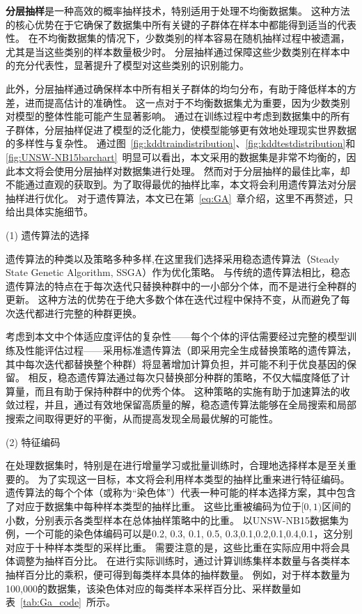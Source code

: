\textbf{分层抽样}是一种高效的概率抽样技术，特别适用于处理不均衡数据集。
这种方法的核心优势在于它确保了数据集中所有关键的子群体在样本中都能得到适当的代表性。
在不均衡数据集的情况下，少数类别的样本容易在随机抽样过程中被遗漏，尤其是当这些类别的样本数量极少时。
分层抽样通过保障这些少数类别在样本中的充分代表性，显著提升了模型对这些类别的识别能力。\par

此外，分层抽样通过确保样本中所有相关子群体的均匀分布，有助于降低样本的方差，进而提高估计的准确性。
这一点对于不均衡数据集尤为重要，因为少数类别对模型的整体性能可能产生显著影响。
通过在训练过程中考虑到数据集中的所有子群体，分层抽样促进了模型的泛化能力，使模型能够更有效地处理现实世界数据的多样性与复杂性。
通过图~\ref{fig:kddtraindistribution}、\ref{fig:kddtestdistribution}和\ref{fig:UNSW-NB15barchart}~明显可以看出，本文采用的数据集是非常不均衡的，因此本文将会使用分层抽样对数据集进行处理。
然而对于分层抽样的最佳比率，却不能通过直观的获取到。为了取得最优的抽样比率，本文将会利用遗传算法对分层抽样进行优化。
对于遗传算法，本文已在第~\ref{eq:GA}~章介绍，这里不再赘述，只给出具体实施细节。\par

(1) 遗传算法的选择\par
遗传算法的种类以及策略多种多样,在这里我们选择采用稳态遗传算法（Steady State Genetic Algorithm, SSGA）作为优化策略。
与传统的遗传算法相比，稳态遗传算法的特点在于每次迭代只替换种群中的一小部分个体，而不是进行全种群的更新。
这种方法的优势在于绝大多数个体在迭代过程中保持不变，从而避免了每次迭代都进行完整的种群更换。\par

考虑到本文中个体适应度评估的复杂性——每个个体的评估需要经过完整的模型训练及性能评估过程——采用标准遗传算法（即采用完全生成替换策略的遗传算法，其中每次迭代都替换整个种群）将显著增加计算负担，并可能不利于优良基因的保留。
相反，稳态遗传算法通过每次只替换部分种群的策略，不仅大幅度降低了计算量，而且有助于保持种群中的优秀个体。
这种策略的实施有助于加速算法的收敛过程，并且，通过有效地保留高质量的解，稳态遗传算法能够在全局搜索和局部搜索之间取得更好的平衡，从而提高发现全局最优解的可能性。

(2) 特征编码\par
在处理数据集时，特别是在进行增量学习或批量训练时，合理地选择样本是至关重要的。
为了实现这一目标，本文将会利用样本类型的抽样比重来进行特征编码。
遗传算法的每个个体（或称为“染色体”）代表一种可能的样本选择方案，其中包含了对应于数据集中每种样本类型的抽样比重。
这些比重被编码为位于$[0,1)$区间的小数，分别表示各类型样本在总体抽样策略中的比重。
以UNSW-NB15数据集为例，一个可能的染色体编码可以是{0.2, 0.3, 0.1, 0.5, 0.3,0.1,0.2,0.1,0.4,0.1}，这分别对应于十种样本类型的采样比重。
需要注意的是，这些比重在实际应用中将会具体调整为抽样百分比。
在进行实际训练时，通过计算训练集样本数量与各类样本抽样百分比的乘积，便可得到每类样本具体的抽样数量。
例如，对于样本数量为100,000的数据集，该染色体对应的每类样本采样百分比、采样数量如表~\ref{tab:Ga_code}~所示。\par

